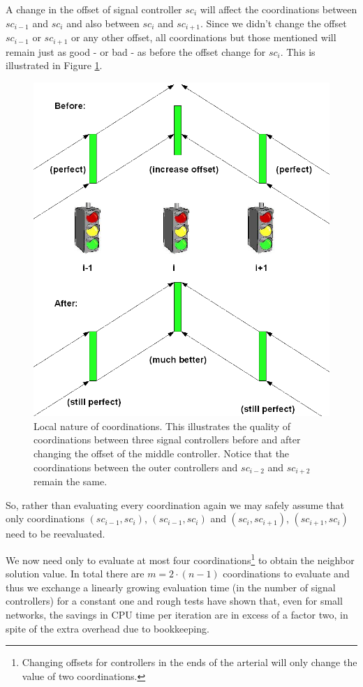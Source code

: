 A change in the offset of signal controller $sc_i$ will affect the coordinations between $sc_{i-1}$ and $sc_{i}$ and also between $sc_{i}$ and $sc_{i+1}$. Since we didn't change the offset $sc_{i-1}$ or $sc_{i+1}$ or any other offset, all coordinations but those mentioned will remain just as good - or bad - as before the offset change for $sc_i$. This is illustrated in Figure \ref{fig:delta_eval}.

\begin{figure}[htbp]
\centering
\includegraphics[scale=0.3]{delta_eval.png}
\caption{Local nature of coordinations. This illustrates the quality of coordinations between three signal controllers before and after changing the offset of the middle controller. Notice that the coordinations between the outer controllers and $sc_{i-2}$ and $sc_{i+2}$ remain the same.}
\label{fig:delta_eval}
\end{figure}

So, rather than evaluating every coordination again we may safely assume that only coordinations $(sc_{i-1},sc_{i})$, $(sc_{i-1},sc_{i})$ and $(sc_{i},sc_{i+1})$, $(sc_{i+1},sc_{i})$ need to be reevaluated. 

We now need only to evaluate at most four coordinations\footnote{Changing offsets for controllers in the ends of the arterial will only change the value of two coordinations.} to obtain the neighbor solution value. In total there are $m = 2\cdot (n-1)$ coordinations to evaluate and thus we exchange a linearly growing evaluation time (in the number of signal controllers) for a constant one and rough tests have shown that, even for small networks, the savings in CPU time per iteration are in excess of a factor two, in spite of the extra overhead due to bookkeeping.

